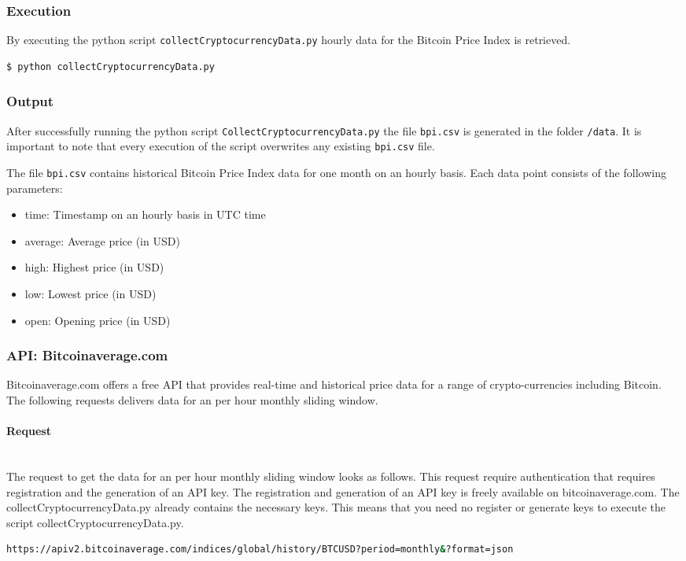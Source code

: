 \documentclass[a4paper,12pt]{article}
\begin{document}
\begin{spacing}{1.2}
\subsubsection{Execution}
\cite{Twitter}
By executing the python script \verb|collectCryptocurrencyData.py| hourly data for the Bitcoin Price Index is retrieved.
\begin{lstlisting}[language=bash]
    $ python collectCryptocurrencyData.py
\end{lstlisting}

\subsubsection{Output}
After successfully running the python script \verb|CollectCryptocurrencyData.py| the file \verb|bpi.csv| is generated in the folder \verb|/data|. It is important to note that every execution of the script overwrites any existing \verb|bpi.csv| file.

The file \verb|bpi.csv| contains historical Bitcoin Price Index data for one month on an hourly basis. Each data point consists of the following parameters:
\begin{itemize}
    \item time: Timestamp on an hourly basis in UTC time
    \item average: Average price (in USD)
    \item high: Highest price (in USD)
    \item low: Lowest price (in USD)
    \item open: Opening price (in USD)
\end{itemize}

\subsubsection{API: Bitcoinaverage.com}
Bitcoinaverage.com offers a free API that provides real-time and historical price data for a range of crypto-currencies including Bitcoin. The following requests delivers data for an per hour monthly sliding window.
\paragraph{Request}\mbox{}\\
The request to get the data for an per hour monthly sliding window looks as follows. This request require authentication that requires registration and the generation of an API key. The registration and generation of an API key is freely available on bitcoinaverage.com. The collectCryptocurrencyData.py already contains the necessary keys. This means that you need no register or generate keys to execute the script collectCryptocurrencyData.py.  
\begin{lstlisting}[language=bash]
https://apiv2.bitcoinaverage.com/indices/global/history/BTCUSD?period=monthly&?format=json
\end{lstlisting}

\end{spacing}
\end{document}
